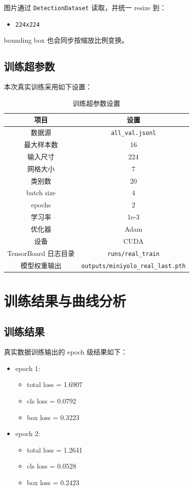 \documentclass[11pt,a4paper]{article}
\begin{document}
图片通过 \texttt{DetectionDataset} 读取，并统一 resize 到：

\begin{itemize}
  \item \texttt{224x224}
\end{itemize}

bounding box 也会同步按缩放比例变换。

\subsection{训练超参数}

本次真实训练采用如下设置：

\begin{table}[H]
  \centering
  \caption{训练超参数设置}
  \begin{tabular}{cc}
    \toprule
    项目 & 设置 \\
    \midrule
    数据源 & \texttt{all\_val.jsonl} \\
    最大样本数 & 16 \\
    输入尺寸 & 224 \\
    网格大小 & 7 \\
    类别数 & 20 \\
    batch size & 4 \\
    epochs & 2 \\
    学习率 & 1e-3 \\
    优化器 & Adam \\
    设备 & CUDA \\
    TensorBoard 日志目录 & \texttt{runs/real\_train} \\
    模型权重输出 & \texttt{outputs/miniyolo\_real\_last.pth} \\
    \bottomrule
  \end{tabular}
\end{table}

\section{训练结果与曲线分析}

\subsection{训练结果}

真实数据训练输出的 epoch 级结果如下：

\begin{itemize}
  \item epoch 1:
    \begin{itemize}
      \item total loss = 1.6907
      \item cls loss = 0.0792
      \item box loss = 0.3223
    \end{itemize}
  \item epoch 2:
    \begin{itemize}
      \item total loss = 1.2641
      \item cls loss = 0.0528
      \item box loss = 0.2423
    \end{itemize}
\end{itemize}
\end{document}

